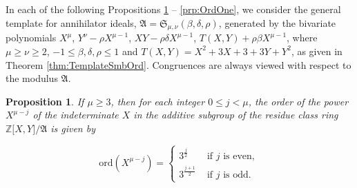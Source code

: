 \documentclass{amsart}
\newtheorem{proposition}{Proposition}[section]
\theoremstyle{definition}
\numberwithin{equation}{section}
\begin{document}
\noindent
In each of the following Propositions
\ref{prp:OrdPowX}
--
\ref{prp:OrdOne},
we consider the general template for annihilator ideals,
\(\mathfrak{A}=\mathfrak{S}_{\mu,\nu}(\beta,\delta,\rho)\),
generated by the bivariate polynomials
\(X^{\mu}\), \(Y^{\nu}-\rho X^{\mu-1}\), \(XY-\rho\delta X^{\mu-1}\), \(T(X,Y)+\rho\beta X^{\mu-1}\),
where \(\mu\ge\nu\ge 2\), \(-1\le\beta,\delta,\rho\le 1\) and \(T(X,Y)=X^2+3X+3+3Y+Y^2\), as given in Theorem
\ref{thm:TemplateSmbOrd}.
Congruences are always viewed with respect to the modulus \(\mathfrak{A}\).

\begin{proposition}
\label{prp:OrdPowX}
If \(\mu\ge 3\), then
for each integer \(0\le j<\mu\),
the order of the power \(X^{\mu-j}\) of the indeterminate \(X\)
in the additive subgroup of the residue class ring \(\mathbb{Z}\lbrack X,Y\rbrack/\mathfrak{A}\)
is given by

\begin{equation}
\label{eqn:OrdPowX}
\mathrm{ord}(X^{\mu-j})=
\begin{cases}
3^{\frac{j}{2}}   & \text{ if } j \text{ is even},\\
3^{\frac{j+1}{2}} & \text{ if } j \text{ is odd}.
\end{cases}
\end{equation}

\end{proposition}
\end{document}
